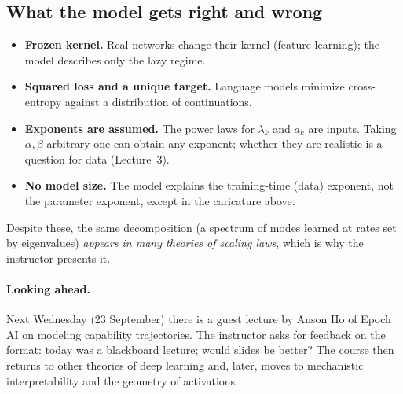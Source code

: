 \subsection{What the model gets right and wrong}
\begin{caution}
\begin{itemize}
  \item \textbf{Frozen kernel.} Real networks change their kernel (feature learning); the model describes only the lazy regime.
  \item \textbf{Squared loss and a unique target.} Language models minimize cross-entropy against a distribution of continuations.
  \item \textbf{Exponents are assumed.} The power laws for $\lambda_k$ and $a_k$ are inputs. Taking $\alpha,\beta$ arbitrary one can obtain any exponent; whether they are realistic is a question for data (Lecture~3).
  \item \textbf{No model size.} The model explains the training-time (data) exponent, not the parameter exponent, except in the caricature above.
\end{itemize}
\end{caution}
Despite these, the same decomposition (a spectrum of modes learned at rates set by eigenvalues) \emph{appears in many theories of scaling laws}, which is why the instructor presents it.

\paragraph{Looking ahead.}
Next Wednesday (23 September) there is a guest lecture by Anson Ho of Epoch AI on modeling capability trajectories. The instructor asks for feedback on the format: today was a blackboard lecture; would slides be better? The course then returns to other theories of deep learning and, later, moves to mechanistic interpretability and the geometry of activations.

